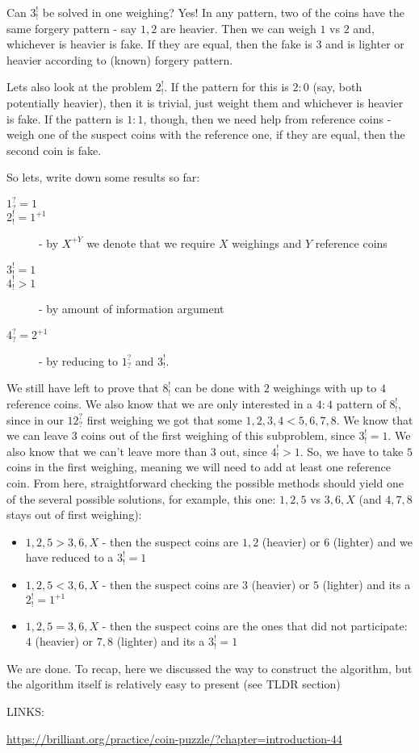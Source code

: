 \begin{problem}
Can $3^!_!$ be solved in one weighing? Yes! In any pattern, two of the coins have the same forgery pattern - say $1,2$ are heavier. Then we can weigh $1$ vs $2$ and, whichever is heavier is fake. If they are equal, then the fake is $3$ and is lighter or heavier according to (known) forgery pattern.

Lets also look at the problem $2^!_!$. If the pattern for this is $2:0$ (say, both potentially heavier), then it is trivial, just weight them and whichever is heavier is fake. If the pattern is $1:1$, though, then we need help from reference coins - weigh one of the suspect coins with the reference one, if they are equal, then the second coin is fake. 

So lets, write down some results so far:
\begin{description}
\item[$1^?_?=1$]
\item[$2^!_!=1^{+1}$] - by $X^{+Y}$ we denote that we require $X$ weighings and $Y$ reference coins
\item[$3^!_!=1$]
\item[$4^!_!>1$] - by amount of information argument
\item[$4^?_?=2^{+1}$] - by reducing to $1^?_?$ and $3^!_!$. \end{description}

We still have left to prove that $8_!^!$ can be done with $2$ weighings with up to $4$ reference coins. We also know that we are only interested in a $4:4$ pattern of $8_!^!$, since in our $12^?_?$ first weighing we got that some $1,2,3,4<5,6,7,8$. We know that we can leave $3$ coins out of the first weighing of this subproblem, since $3^!_!=1$. We also know that we can't leave more than $3$ out, since $4^!_!>1$. So, we have to take $5$ coins in the first weighing, meaning we will need to add at least one reference coin. From here, straightforward checking the possible methods should yield one of the several possible solutions, for example, this one: $1,2,5$ vs $3,6,X$ (and $4,7,8$ stays out of first weighing):
\begin{itemize}
\item $1,2,5 > 3,6,X$ - then the suspect coins are $1,2$ (heavier) or $6$ (lighter) and we have reduced to a $3^!_!=1$
\item $1,2,5 < 3,6,X$ - then the suspect coins are $3$ (heavier) or $5$ (lighter) and its a $2^!_!=1^{+1}$
\item $1,2,5 = 3,6,X$ - then the suspect coins are the ones that did not participate: $4$ (heavier) or $7,8$ (lighter) and its a $3^!_!=1$
\end{itemize}

We are done. 
To recap, here we discussed the way to construct the algorithm, but the algorithm itself is relatively easy to present (see TLDR section)

LINKS:

\url{https://brilliant.org/practice/coin-puzzle/?chapter=introduction-44}
\end{problem}
%


